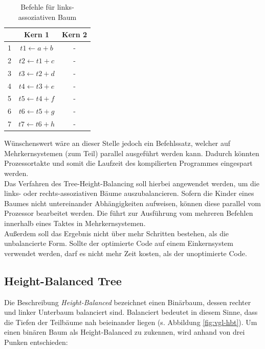 \begin{table}
	\begin{center}
		\begin{tabular}{|c|c|c|}
			\hline  & Kern 1 & Kern 2 \\ 
			\hline 1 & $ t1 \leftarrow a + b $& - \\ 
			\hline 2 & $ t2 \leftarrow t1 + c $& - \\ 
			\hline 3 & $ t3 \leftarrow t2 + d $& - \\ 
			\hline 4 & $ t4 \leftarrow t3 + e $& - \\ 
			\hline 5 & $ t5 \leftarrow t4 + f $& - \\ 
			\hline 6 & $ t6 \leftarrow t5 + g $& - \\ 
			\hline 7 & $ t7 \leftarrow t6 + h $& - \\ 
			\hline 
		\end{tabular}
	\end{center}
	\caption{Befehle für links-assoziativen Baum}
	\label{tab:links-assoziativer-baum}
\end{table}


Wünschenswert wäre an dieser Stelle jedoch ein Befehlssatz, welcher auf Mehrkernsystemen (zum Teil) parallel ausgeführt werden kann. Dadurch könnten Prozessortakte und somit die Laufzeit des kompilierten Programmes eingespart werden.\\
Das Verfahren des Tree-Height-Balancing soll hierbei angewendet werden, um die links- oder rechts-assoziativen Bäume auszubalancieren. Sofern die Kinder eines Baumes nicht untereinander Abhängigkeiten aufweisen, können diese parallel vom Prozessor bearbeitet werden. Die führt zur Ausführung vom mehreren Befehlen innerhalb eines Taktes in Mehrkernsystemen.\\
Außerdem soll das Ergebnis nicht über mehr Schritten bestehen, als die unbalancierte Form. Sollte der optimierte Code auf einem Einkernsystem verwendet werden, darf es nicht mehr Zeit kosten, als der unoptimierte Code.


\subsection{Height-Balanced Tree}
Die Beschreibung \textit{Height-Balanced} bezeichnet einen Binärbaum, dessen rechter und linker Unterbaum balanciert sind. Balanciert bedeutet in diesem Sinne, dass die Tiefen der Teilbäume nah beieinander liegen (s. Abbildung \ref{fig:vgl-hbt}).
Um einen binären Baum als Height-Balanced zu zukennen, wird anhand von drei Punken entschieden:

